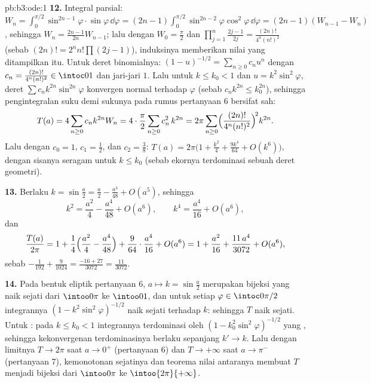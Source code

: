 \begin{solution}{pb:b3:ode:1}
\textbf{12.} Integral parsial: $W_n = \int_0^{\pi/2}\sin^{2n-1}\varphi
\cdot\sin\varphi\,\dd\varphi = (2n-1)\int_0^{\pi/2}
\sin^{2n-2}\varphi\cos^2\varphi\,\dd\varphi = (2n-1)(W_{n-1}
- W_n)$, sehingga $W_n = \frac{2n-1}{2n}W_{n-1}$; lalu dengan $W_0 =
\frac\pi2$ dan $\prod_{j=1}^n\frac{2j-1}{2j} =
\frac{(2n)!}{4^n(n!)^2}$ (sebab $(2n)! = 2^nn!\prod(2j-1)$),
induksinya memberikan nilai yang ditampilkan itu. Untuk deret binomialnya: $(1 -
u)^{-1/2} = \sum_{n\geq0}c_nu^n$ dengan $c_n =
\frac{(2n)!}{4^n(n!)^2} \in \intoc01$ dan jari-jari $1$. Lalu untuk $k
\leq k_0 < 1$ dan $u = k^2\sin^2\varphi$, deret
$\sum c_nk^{2n}\sin^{2n}\varphi$ konvergen normal terhadap
$\varphi$ (sebab $c_nk^{2n} \leq k_0^{2n}$), sehingga pengintegralan suku demi
sukunya pada rumus pertanyaan 6 bersifat sah:
\[
T(a) = 4\sum_{n\geq0}c_nk^{2n}W_n
= 4\cdot\frac\pi2\sum_{n\geq0}c_n^2\,k^{2n}
= 2\pi\sum_{n\geq0}
\Bigl(\frac{(2n)!}{4^n(n!)^2}\Bigr)^{\!2}k^{2n} .
\]
Lalu dengan $c_0 = 1$, $c_1 = \frac12$, dan $c_2 = \frac38$: $T(a) =
2\pi\bigl(1 + \frac{k^2}4 + \frac{9k^4}{64} + O(k^6)\bigr)$,
dengan sisanya seragam untuk $k \leq k_0$ (sebab ekornya terdominasi sebuah
deret geometri).

\textbf{13.} Berlaku $k = \sin\frac a2 = \frac a2 - \frac{a^3}{48} +
O(a^5)$, sehingga
\[
k^2 = \frac{a^2}4 - \frac{a^4}{48} + O(a^6),
\qquad
k^4 = \frac{a^4}{16} + O(a^6) ,
\]
dan
\[
\frac{T(a)}{2\pi} = 1 + \frac14\Bigl(\frac{a^2}4 -
\frac{a^4}{48}\Bigr) + \frac9{64}\cdot\frac{a^4}{16} +
O(a^6)
= 1 + \frac{a^2}{16} + \frac{11\,a^4}{3072} + O(a^6) ,
\]
sebab $-\frac1{192} + \frac9{1024} = \frac{-16 + 27}{3072}
= \frac{11}{3072}$.

\textbf{14.} Pada bentuk eliptik pertanyaan 6, $a \mapsto
k = \sin\frac a2$ merupakan bijeksi  yang naik
sejati dari $\intoo0\pi$ ke $\intoo01$, dan untuk setiap
$\varphi \in \intoc0{\pi/2}$ integrannya $(1 -
k^2\sin^2\varphi)^{-1/2}$ naik sejati terhadap $k$: sehingga $T$
naik sejati. Untuk : pada $k \leq k_0 < 1$
integrannya terdominasi oleh $(1 -
k_0^2\sin^2\varphi)^{-1/2}$ yang , sehingga kekonvergenan terdominasinya
berlaku sepanjang $k' \to k$. Lalu dengan limitnya $T \to 2\pi$ saat $a
\to 0^+$ (pertanyaan 6) dan $T \to +\infty$ saat $a \to \pi^-$
(pertanyaan 7), kemonotonan sejatinya dan teorema nilai
antaranya membuat $T$ menjadi bijeksi dari $\intoo0\pi$ ke
$\intoo{2\pi}{+\infty}$.


\end{solution}
